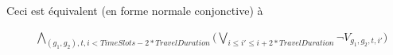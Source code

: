 \documentclass[a4paper]{article}
\begin{document}
Ceci est équivalent (en forme normale conjonctive) à

\begin{equation*}
    \begin{split}
      & \bigwedge_{(g_1, g_2), t, i < TimeSlots - 2 * TravelDuration}         
         \big( 
        \bigvee_{i \leq i' \leq i + 2 * TravelDuration} 
        \neg V_{g_1, g_2, t, i'} \big) \\
    \end{split}
\end{equation*}
\end{document}
